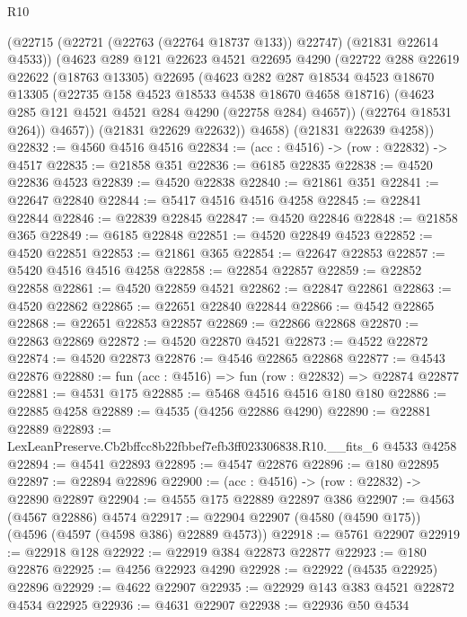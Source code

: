 \begin{lexlean}{R10}
\begin{coremodule}
            (@22715 (@22721 (@22763 (@22764 @18737 @133)) @22747) (@21831 @22614 @4533))
            (@4623
              @289
              @121
              @22623
              @4521
              @22695
              @4290
              (@22722
                @288
                @22619
                @22622
                (@18763 @13305)
                @22695
                (@4623
                  @282
                  @287
                  @18534
                  @4523
                  @18670
                  @13305
                  (@22735 @158 @4523 @18533 @4538 @18670 @4658 @18716)
                  (@4623 @285 @121 @4521 @4521 @284 @4290 (@22758 @284) @4657))
                (@22764 @18531 @264))
              @4657))
          (@21831 @22629 @22632))
        @4658)
      (@21831 @22639 @4258))
@22832 := @4560 @4516 @4516
@22834 := (acc : @4516) -> (row : @22832) -> @4517
@22835 := @21858 @351
@22836 := @6185 @22835
@22838 := @4520 @22836 @4523
@22839 := @4520 @22838
@22840 := @21861 @351
@22841 := @22647 @22840
@22844 := @5417 @4516 @4516 @4258
@22845 := @22841 @22844
@22846 := @22839 @22845
@22847 := @4520 @22846
@22848 := @21858 @365
@22849 := @6185 @22848
@22851 := @4520 @22849 @4523
@22852 := @4520 @22851
@22853 := @21861 @365
@22854 := @22647 @22853
@22857 := @5420 @4516 @4516 @4258
@22858 := @22854 @22857
@22859 := @22852 @22858
@22861 := @4520 @22859 @4521
@22862 := @22847 @22861
@22863 := @4520 @22862
@22865 := @22651 @22840 @22844
@22866 := @4542 @22865
@22868 := @22651 @22853 @22857
@22869 := @22866 @22868
@22870 := @22863 @22869
@22872 := @4520 @22870 @4521
@22873 := @4522 @22872
@22874 := @4520 @22873
@22876 := @4546 @22865 @22868
@22877 := @4543 @22876
@22880 := fun (acc : @4516) => fun (row : @22832) => @22874 @22877
@22881 := @4531 @175
@22885 := @5468 @4516 @4516 @180 @180
@22886 := @22885 @4258
@22889 := @4535 (@4256 @22886 @4290)
@22890 := @22881 @22889
@22893 := LexLeanPreserve.Cb2bffcc8b22fbbef7efb3ff023306838.R10.__fits_6 @4533 @4258
@22894 := @4541 @22893
@22895 := @4547 @22876
@22896 := @180 @22895
@22897 := @22894 @22896
@22900 := (acc : @4516) -> (row : @22832) -> @22890 @22897
@22904 := @4555 @175 @22889 @22897 @386
@22907 := @4563 (@4567 @22886) @4574
@22917 := @22904 @22907 (@4580 (@4590 @175)) (@4596 (@4597 (@4598 @386) @22889 @4573))
@22918 := @5761 @22907
@22919 := @22918 @128
@22922 := @22919 @384 @22873 @22877
@22923 := @180 @22876
@22925 := @4256 @22923 @4290
@22928 := @22922 (@4535 @22925) @22896
@22929 := @4622 @22907
@22935 := @22929 @143 @383 @4521 @22872 @4534 @22925
@22936 := @4631 @22907
@22938 := @22936 @50 @4534

\end{coremodule}
\end{lexlean}
